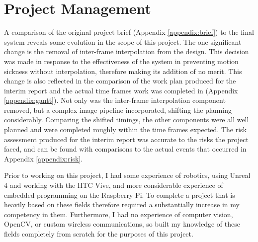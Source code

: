 \chapter{Project Management}
\label{chapter:mang}

A comparison of the original project brief (Appendix \ref{appendix:brief}) to the final system reveals some evolution in the scope of this project. The one significant change is the removal of inter-frame interpolation from the design. This decision was made in response to the effectiveness of the system in preventing motion sickness without interpolation, therefore making its addition of no merit. This change is also reflected in the comparison of the work plan produced for the interim report and the actual time frames work was completed in (Appendix \ref{appendix:gantt}). Not only was the inter-frame interpolation component removed, but a complex image pipeline incorporated, shifting the planning considerably. Comparing the shifted timings, the other components were all well planned and were completed roughly within the time frames expected. The risk assessment produced for the interim report was accurate to the risks the project faced, and can be found with comparisons to the actual events that occurred in Appendix \ref{appendix:risk}.

Prior to working on this project, I had some experience of robotics, using Unreal 4 and working with the HTC Vive, and more considerable experience of embedded programming on the Raspberry Pi. To complete a project that is heavily based on these fields therefore required a substantially increase in my competency in them. Furthermore, I had no experience of computer vision, OpenCV, or custom wireless communications, so built my knowledge of these fields completely from scratch for the purposes of this project.